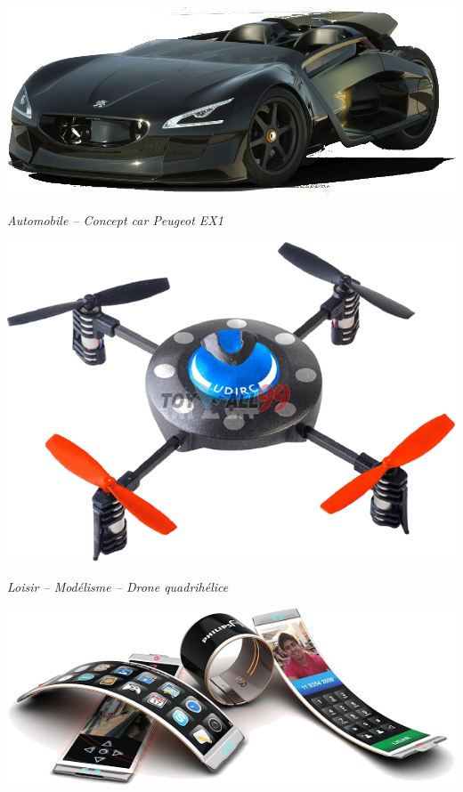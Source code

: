 \documentclass[11pt,oneside]{article}
\begin{document}
\begin{exemple}

\noindent\begin{minipage}[c]{.22\linewidth}
\begin{center}
\includegraphics[width=\textwidth]{png/cc_ex1}

\textit{Automobile -- Concept car Peugeot EX1}
\end{center}
\end{minipage} \hfill
\begin{minipage}[c]{.22\linewidth}
\begin{center}
\includegraphics[width=.7\textwidth]{png/quadri}

\textit{Loisir -- Modélisme -- Drone quadrihélice}
\end{center}
\end{minipage} \hfill
\begin{minipage}[c]{.22\linewidth}
\begin{center}
\includegraphics[width=\textwidth]{png/oled}


\end{center}
\end{minipage}
\end{exemple}
\end{document}
